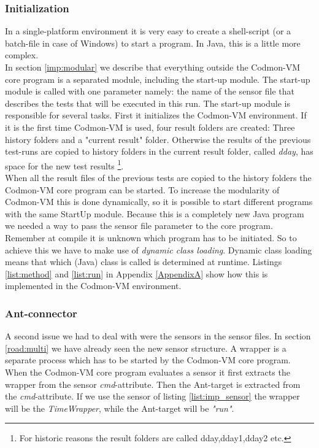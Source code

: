 \documentclass{article}
\newcommand{\project}{Codmon-VM}
\begin{document}
\subsubsection{Initialization}
\label{imp:start}
In a single-platform environment it is very easy to create a shell-script (or a batch-file in case of Windows) to start a program. In Java, this is a little more complex.\\

\noindent In section \ref{imp:modular} we describe that everything outside the \project{} core program is a separated module, including the start-up module. The start-up module is called with one parameter namely: 
the name of the sensor file that describes the tests that will be executed in this run. The start-up module is responsible for several tasks. First it initializes the \project{} environment. If it is the 
first time \project{} is used, four result folders are created: Three history folders and a "current result" folder. Otherwise the results of the previous test-runs are copied to history folders in the 
current result folder, called \emph{dday}, has space for the new test results \footnote{For historic reasons the result folders are called dday,dday1,dday2 etc.}.\\

\noindent When all the result files of the previous tests are copied to the history folders the \project{} core program can be started. To increase the modularity of \project{} this is done dynamically, so 
it is possible to start different programs with the same StartUp module. Because this is a completely new Java program we needed a way to pass the sensor file parameter to the core program. Remember at 
compile it is unknown which program has to be initiated. So to achieve this we have to make use of \emph{dynamic class loading}. Dynamic class loading means that which (Java) class is called is determined 
at runtime. Listings \ref{list:method} and \ref{list:run} in Appendix \ref{AppendixA} show how this is implemented in the \project{} environment.

\subsubsection{Ant-connector}
\label{imp:ant}
A second issue we had to deal with were the sensors in the sensor files. In section \ref{road:multi} we have already seen the new sensor structure. A wrapper is a separate process which has to be started by 
the \project{} core program.  When the \project{} core program evaluates a sensor it first extracts the wrapper from the sensor \emph{cmd}-attribute. Then the Ant-target is extracted from the 
\emph{cmd}-attribute. If we use the sensor of listing \ref{list:imp_sensor} the wrapper will be the \emph{TimeWrapper}, while the Ant-target will be \emph{"run"}.\\
\end{document}
